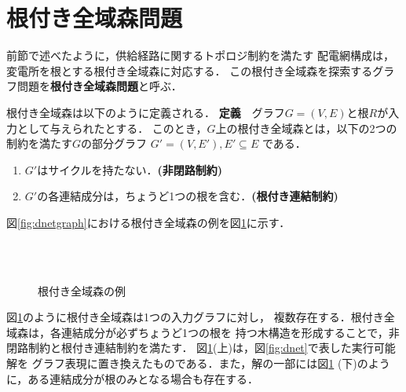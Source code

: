 \section{根付き全域森問題}
前節で述べたように，供給経路に関するトポロジ制約を満たす
配電網構成は，変電所を根とする根付き全域森に対応する．
この根付き全域森を探索するグラフ問題を\textbf{根付き全域森問題}と呼ぶ．

根付き全域森は以下のように定義される．\cite{Minato:dnet:netuki}
\newline
\textbf{定義}~~グラフ$G=(V,E)$と根$R$が入力として与えられたとする．
このとき，$G$上の根付き全域森とは，以下の2つの制約を満たす$G$の部分グラフ
$G'=(V,E'), E' \subseteq E$ である．
\begin{enumerate}
 \item $G'$はサイクルを持たない．\textbf{(非閉路制約)}
 \item $G'$の各連結成分は，ちょうど1つの根を含む．\textbf{(根付き連結制約)}
\end{enumerate}
図\ref{fig:dnetgraph}における根付き全域森の例を図\ref{fig:netuki}に示す．

\begin{figure}[htbp]
  \centering
  \scalebox{0.8}{}
 \mbox{}\\ \mbox{}\\
  \centering
  \scalebox{0.8}{}
 \caption{根付き全域森の例}
 \label{fig:netuki}
\end{figure}

図\ref{fig:netuki}のように根付き全域森は1つの入力グラフに対し，
複数存在する．根付き全域森は，各連結成分が必ずちょうど1つの根を
持つ木構造を形成することで，非閉路制約と根付き連結制約を満たす．
図\ref{fig:netuki}(上)は，図\ref{fig:dnet}で表した実行可能解を
グラフ表現に置き換えたものである．また，解の一部には図\ref{fig:netuki}
(下)のように，ある連結成分が根のみとなる場合も存在する．
